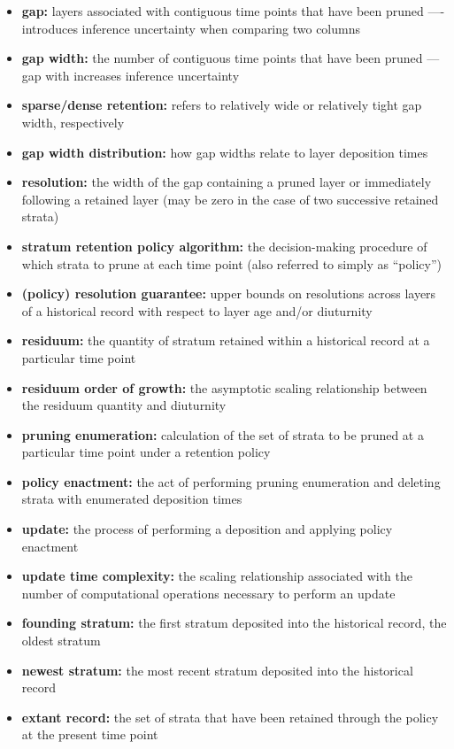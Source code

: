 \begin{itemize}
  \item \textbf{gap:} layers associated with contiguous time points that have been pruned ---- introduces inference uncertainty when comparing two columns
  \item \textbf{gap width:} the number of contiguous time points that have been pruned --- gap with increases inference uncertainty
  \item \textbf{sparse/dense retention:} refers to relatively wide or relatively tight gap width, respectively
  \item \textbf{gap width distribution:} how gap widths relate to layer deposition times
  \item \textbf{resolution:} the width of the gap containing a pruned layer or immediately following a retained layer (may be zero in the case of two successive retained strata)
  \item \textbf{stratum retention policy algorithm:} the decision-making procedure of which strata to prune at each time point (also referred to simply as ``policy'')
  \item \textbf{(policy) resolution guarantee:} upper bounds on resolutions across layers of a historical record with respect to layer age and/or diuturnity
  \item \textbf{residuum:} the quantity of stratum retained within a historical record at a particular time point
  \item \textbf{residuum order of growth:} the asymptotic scaling relationship between the residuum quantity and diuturnity
  \item \textbf{pruning enumeration:} calculation of the set of strata to be pruned at a particular time point under a retention policy
  \item \textbf{policy enactment:} the act of performing pruning enumeration and deleting strata with enumerated deposition times
  \item \textbf{update:} the process of performing a deposition and applying policy enactment
  \item \textbf{update time complexity:} the scaling relationship associated with the number of computational operations necessary to perform an update
  \item \textbf{founding stratum:} the first stratum deposited into the historical record, the oldest stratum
  \item \textbf{newest stratum:} the most recent stratum deposited into the historical record
  \item \textbf{extant record:} the set of strata that have been retained through the policy at the present time point

\end{itemize}
